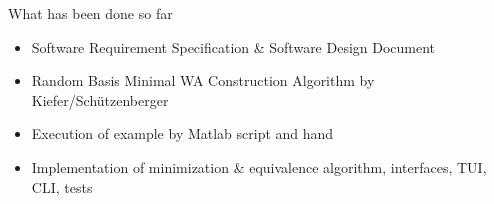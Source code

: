 \documentclass[rgb, pdf]{beamer}
\begin{document}
    \begin{frame}{What has been done so far}
        \begin{itemize}
            \item Software Requirement Specification \& Software Design Document \\ \vspace{0.7cm}
            \item Random Basis Minimal WA Construction Algorithm by Kiefer/Schützenberger~\autocite{Kiefer2013OnTC} \\ \vspace{0.7cm}
            \item Execution of example by Matlab script and hand \\ \vspace{0.7cm}
            \item Implementation of minimization \& equivalence algorithm, interfaces, TUI, CLI, tests \\ \vspace{0.7cm}
        \end{itemize}
    \end{frame}
    
\end{document}
